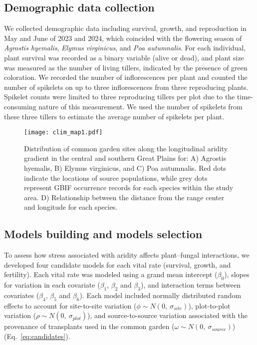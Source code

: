 \documentclass[12pt]{article}\usepackage[]{graphicx}\usepackage[dvipsnames]{xcolor}
\begin{document}
\subsection*{Demographic data collection}
We collected demographic data including survival, growth, and reproduction in May and June of 2023 and 2024, which coincided with the flowering season of \emph{Agrostis hyemalis}, \emph{Elymus virginicus}, and \emph{Poa autumnalis}. 
For each individual, plant survival was recorded as a binary variable (alive or dead), and plant size was measured as the number of living tillers, indicated by the presence of green coloration.  
We recorded the number of inflorescences per plant and counted the number of spikelets on up to three inflorescences from three reproducing plants.  
Spikelet counts were limited to three reproducing tillers per plot due to the time-consuming nature of this measurement.  
We used the number of spikelets from these three tillers to estimate the average number of spikelets per plant.

\begin{figure}[H]
\centering
\texttt{[image: clim\_map1.pdf]}
\caption{Distribution of common garden sites along the longitudinal aridity gradient in the central and southern Great Plains for: A) Agrostis hyemalis, B) Elymus virginicus, and C) Poa autumnalis. Red dots indicate the locations of source populations, while grey dots represent GBIF occurrence records for each species within the study area. D) Relationship between the distance from the range center and longitude for each species.}
\label{fig:site}
\end{figure}


\subsection*{Models building and models selection}
To assess how stress associated with aridity affects plant–fungal  interactions, we developed four candidate models for each vital rate (survival, growth, and fertility).  
Each vital rate was modeled using a grand mean intercept ($\beta_{0}$), slopes for variation in each covariate ($\beta_{1}$, $\beta_{2}$ and $\beta_{3}$), and interaction terms between covariates ($\beta_{4}$, $\beta_{5}$ and $\beta_{6}$).  
Each model included normally distributed random effects to account for site-to-site variation ($\phi \sim N(0,\ \sigma_{site})$), plot-to-plot variation ($\rho \sim N(0,\ \sigma_{plot})$), and source-to-source variation associated with the provenance of transplants used in the common garden ($\omega \sim N(0,\ \sigma_{source})$) (Eq.~\ref{eq:candidates}).
\end{document}
